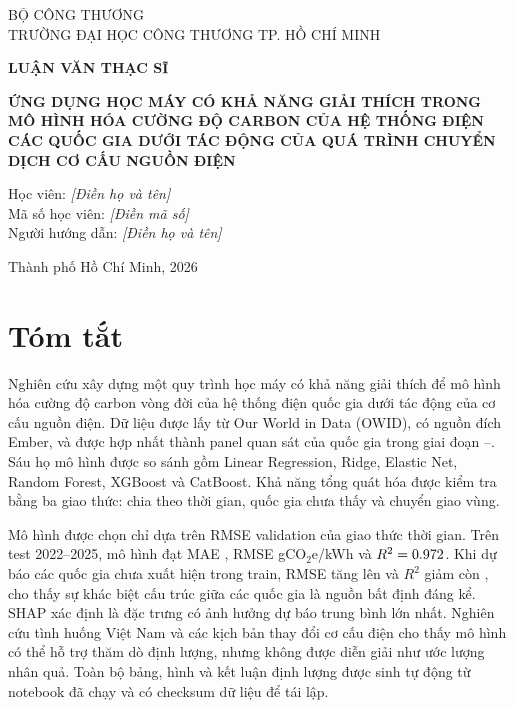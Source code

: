 \documentclass[12pt,a4paper,oneside]{report}
\begin{document}
\begin{titlepage}
\centering
{\large BỘ CÔNG THƯƠNG\\TRƯỜNG ĐẠI HỌC CÔNG THƯƠNG TP. HỒ CHÍ MINH\par}
\vspace{2.0cm}
{\Large\bfseries LUẬN VĂN THẠC SĨ\par}
\vspace{1.4cm}
{\LARGE\bfseries ỨNG DỤNG HỌC MÁY CÓ KHẢ NĂNG GIẢI THÍCH TRONG MÔ HÌNH HÓA CƯỜNG ĐỘ CARBON CỦA HỆ THỐNG ĐIỆN CÁC QUỐC GIA DƯỚI TÁC ĐỘNG CỦA QUÁ TRÌNH CHUYỂN DỊCH CƠ CẤU NGUỒN ĐIỆN\par}
\vfill
{\large Học viên: \textit{[Điền họ và tên]}\\
Mã số học viên: \textit{[Điền mã số]}\\
Người hướng dẫn: \textit{[Điền họ và tên]}\par}
\vfill
{\large Thành phố Hồ Chí Minh, 2026\par}
\end{titlepage}

\chapter*{Tóm tắt}
Nghiên cứu xây dựng một quy trình học máy có khả năng giải thích để mô hình hóa cường độ carbon vòng đời của hệ thống điện quốc gia dưới tác động của cơ cấu nguồn điện. Dữ liệu được lấy từ Our World in Data (OWID), có nguồn đích Ember, và được hợp nhất thành panel \PanelRows{} quan sát của \PanelCountries{} quốc gia trong giai đoạn \PanelStartYear--\PanelEndYear. Sáu họ mô hình được so sánh gồm Linear Regression, Ridge, Elastic Net, Random Forest, XGBoost và CatBoost. Khả năng tổng quát hóa được kiểm tra bằng ba giao thức: chia theo thời gian, quốc gia chưa thấy và chuyển giao vùng.

Mô hình \BestModel{} được chọn chỉ dựa trên RMSE validation của giao thức thời gian. Trên test 2022--2025, mô hình đạt MAE \TemporalMAE{}, RMSE \TemporalRMSE{} gCO$_2$e/kWh và $R^2=0.972$. Khi dự báo các quốc gia chưa xuất hiện trong train, RMSE tăng lên \UnseenRMSE{} và $R^2$ giảm còn \UnseenRsquared{}, cho thấy sự khác biệt cấu trúc giữa các quốc gia là nguồn bất định đáng kể. SHAP xác định \texttt{\TopShapFeature} là đặc trưng có ảnh hưởng dự báo trung bình lớn nhất. Nghiên cứu tình huống Việt Nam và các kịch bản thay đổi cơ cấu điện cho thấy mô hình có thể hỗ trợ thăm dò định lượng, nhưng không được diễn giải như ước lượng nhân quả. Toàn bộ bảng, hình và kết luận định lượng được sinh tự động từ notebook đã chạy và có checksum dữ liệu để tái lập.
\end{document}
